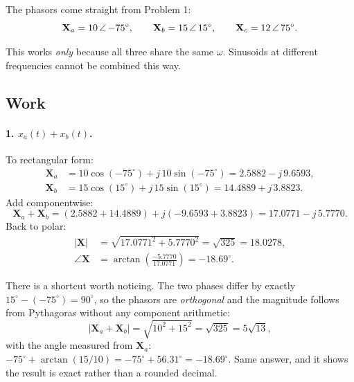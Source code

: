 The phasors come straight from Problem 1:
\begin{equation}
  \mathbf{X}_a = 10\,\angle\,\mathord{-75^\circ}, \qquad
  \mathbf{X}_b = 15\,\angle\,\mathord{15^\circ},  \qquad
  \mathbf{X}_c = 12\,\angle\,\mathord{75^\circ}.
\end{equation}

This works \emph{only} because all three share the same $\omega$. Sinusoids at
different frequencies cannot be combined this way.

\subsection*{Work}

\paragraph{1. $x_a(t) + x_b(t)$.}
To rectangular form:
\begin{align}
  \mathbf{X}_a &= 10\cos(-75^\circ) + j\,10\sin(-75^\circ)
                = 2.5882 - j\,9.6593, \\
  \mathbf{X}_b &= 15\cos(15^\circ)  + j\,15\sin(15^\circ)
                = 14.4889 + j\,3.8823.
\end{align}
Add componentwise:
\begin{equation}
  \mathbf{X}_a + \mathbf{X}_b = (2.5882 + 14.4889) + j(-9.6593 + 3.8823)
                              = 17.0771 - j\,5.7770.
\end{equation}
Back to polar:
\begin{align}
  |\mathbf{X}| &= \sqrt{17.0771^2 + 5.7770^2} = \sqrt{325} = 18.0278, \\
  \angle\mathbf{X} &= \arctan\!\left(\frac{-5.7770}{17.0771}\right) = -18.69^\circ .
\end{align}

There is a shortcut worth noticing. The two phases differ by exactly
$15^\circ - (-75^\circ) = 90^\circ$, so the phasors are \emph{orthogonal} and the
magnitude follows from Pythagoras without any component arithmetic:
\begin{equation}
  |\mathbf{X}_a + \mathbf{X}_b| = \sqrt{10^2 + 15^2} = \sqrt{325} = 5\sqrt{13},
\end{equation}
with the angle measured from $\mathbf{X}_a$:
$-75^\circ + \arctan(15/10) = -75^\circ + 56.31^\circ = -18.69^\circ$. Same answer,
and it shows the result is exact rather than a rounded decimal.

